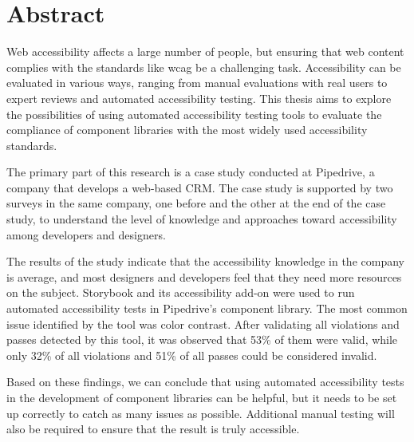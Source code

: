 \documentclass{master_thesis}
\begin{document}
\section*{Abstract}




Web accessibility affects a large number of people, but ensuring that web content complies with the standards like \ac{wcag} be a challenging task. Accessibility can be evaluated in various ways, ranging from manual evaluations with real users to expert reviews and automated accessibility testing. This thesis aims to explore the possibilities of using automated accessibility testing tools to evaluate the compliance of component libraries with the most widely used accessibility standards.


The primary part of this research is a case study conducted at Pipedrive, a company that develops a web-based CRM. The case study is supported by two surveys in the same company, one before and the other at the end of the case study, to understand the level of knowledge and approaches toward accessibility among developers and designers.

The results of the study indicate that the accessibility knowledge in the company is average, and most designers and developers feel that they need more resources on the subject. Storybook and its accessibility add-on were used to run automated accessibility tests in Pipedrive's component library. The most common issue identified by the tool was color contrast. After validating all violations and passes detected by this tool, it was observed that 53\% of them were valid, while only 32\% of all violations and 51\% of all passes could be considered invalid.


Based on these findings, we can conclude that using automated accessibility tests in the development of component libraries can be helpful, but it needs to be set up correctly to catch as many issues as possible. Additional manual testing will also be required to ensure that the result is truly accessible.
\end{document}
